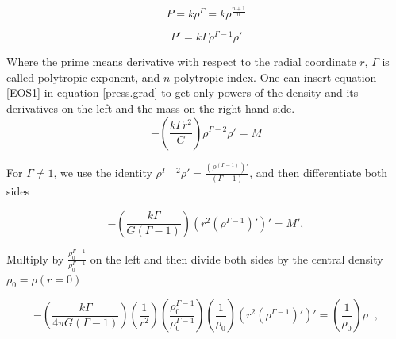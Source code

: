 \begin{equation}\label{EOS0}
P = k \rho^{\Gamma} = k \rho^{\frac{n+1}{n}}
\end{equation}

\begin{equation}\label{EOS1}
P' = k \Gamma \rho^{\Gamma-1} \rho'
\end{equation}


Where the prime means derivative with respect to the radial coordinate $r$, $\Gamma$ is called polytropic exponent, and $n$ polytropic index. One can insert equation \ref{EOS1} in equation \ref{press.grad} to get only powers of the density and its derivatives on the left and the mass on the right-hand side. 
$$
-\left( \frac{k \Gamma r^2}{G} \right) \rho^{\Gamma-2} \rho' = M
$$

%
%

For $\Gamma \neq 1$, we use the identity $\rho^{\Gamma-2} \rho' = \frac{(\rho^{(\Gamma -1)})'}{(\Gamma -1)}$, and then differentiate both sides

\begin{equation}
-\left( \frac{k \Gamma}{G(\Gamma-1)} \right) (r^2 (\rho^{\Gamma-1})')' = M',
\end{equation}

Multiply by $\frac{\rho_0^{\Gamma-1}}{\rho_0^{\Gamma-1}}$ on the left and then divide both sides by  the central density $\rho_0 = \rho(r=0)$

\begin{equation}
-\left( \frac{k \Gamma}{4\pi G(\Gamma-1)} \right)\left(\frac{1}{r^2}\right) \left( \frac{\rho_0^{\Gamma-1}}{\rho_0^{\Gamma-1}} \right) \left( \frac{1}{\rho_0} \right)(r^2 (\rho^{\Gamma-1})' )' = \left( \frac{1}{\rho_0} \right) \rho \;\;,
\end{equation}


